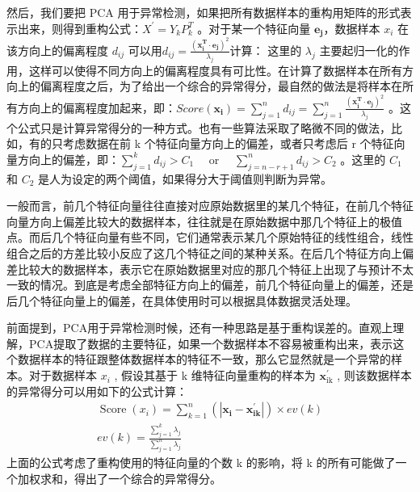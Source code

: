 \documentclass[UTF8]{ctexart}
\begin{document}
        然后，我们要把 PCA 用于异常检测，如果把所有数据样本的重构用矩阵的形式表示出来，则得到重构公式：\(X^{\prime}=Y_{k} P_{k}^{T}\)  。对于某一个特征向量 \(\mathbf{e}_{\mathbf{j}}\)，数据样本 \(x_{i}\) 在该方向上的偏离程度 \(d_{ij}\) 可以用\(d_{i j}=\frac{\left(\mathbf{x}_{\mathbf{i}}^{\mathbf{T}} \cdot \mathbf{e}_{\mathbf{j}}\right)^{2}}{\lambda_{j}}\)计算：
        这里的 \(\lambda_{j}\) 主要起归一化的作用，这样可以使得不同方向上的偏离程度具有可比性。在计算了数据样本在所有方向上的偏离程度之后，为了给出一个综合的异常得分，最自然的做法是将样本在所有方向上的偏离程度加起来，即：\(S c o r e\left(\mathbf{x}_{\mathbf{i}}\right)=\sum_{j=1}^{n} d_{i j}=\sum_{j=1}^{n} \frac{\left(\mathbf{x}_{\mathbf{i}}^{\mathbf{T}} \cdot \mathbf{e}_{\mathbf{j}}\right)^{2}}{\lambda_{j}}\) 。这个公式只是计算异常得分的一种方式。也有一些算法采取了略微不同的做法，比如，有的只考虑数据在前 k 个特征向量方向上的偏差，或者只考虑后 r 个特征向量方向上的偏差，即：\(\sum_{j=1}^{k} d_{i j}>C_{1} \quad\) or \(\quad \sum_{j=n-r+1}^{n} d_{i j}>C_{2}\) 。这里的 \(C_{1}\) 和 \(C_{2}\) 是人为设定的两个阈值，如果得分大于阈值则判断为异常。
        
        一般而言，前几个特征向量往往直接对应原始数据里的某几个特征，在前几个特征向量方向上偏差比较大的数据样本，往往就是在原始数据中那几个特征上的极值点。而后几个特征向量有些不同，它们通常表示某几个原始特征的线性组合，线性组合之后的方差比较小反应了这几个特征之间的某种关系。在后几个特征方向上偏差比较大的数据样本，表示它在原始数据里对应的那几个特征上出现了与预计不太一致的情况。到底是考虑全部特征方向上的偏差，前几个特征向量上的偏差，还是后几个特征向量上的偏差，在具体使用时可以根据具体数据灵活处理。
        
        前面提到，PCA用于异常检测时候，还有一种思路是基于重构误差的。直观上理解，PCA提取了数据的主要特征，如果一个数据样本不容易被重构出来，表示这个数据样本的特征跟整体数据样本的特征不一致，那么它显然就是一个异常的样本。对于数据样本 \(x_{i}\) , 假设其基于 k 维特征向量重构的样本为 \(\mathbf{x}_{\mathrm{ik}}^{\prime}\) , 则该数据样本的异常得分可以用如下的公式计算：
        $$
        \begin{array}{l}
        \operatorname { Score }\left(x_{i}\right)=\sum_{k=1}^{n}\left(\left|\mathbf{x}_{\mathbf{i}}-\mathbf{x}_{\mathbf{i k}}^{\prime}\right|\right) \times e v(k) \\
        e v(k)=\frac{\sum_{j=1}^{k} \lambda_{j}}{\sum_{j=1}^{n} \lambda_{j}}
        \end{array}
        $$
        上面的公式考虑了重构使用的特征向量的个数 k 的影响，将 k 的所有可能做了一个加权求和，得出了一个综合的异常得分。\cite{link7}
\end{document}
